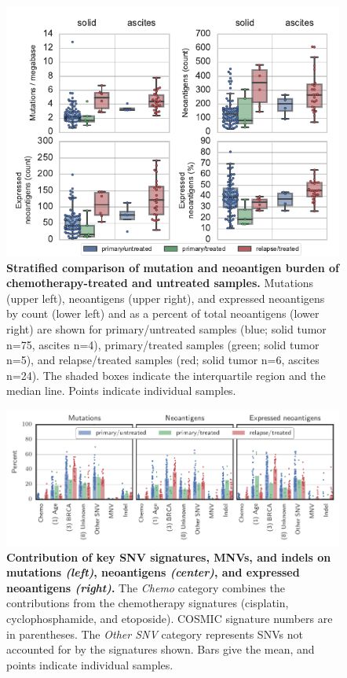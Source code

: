 \begin{figure}
\centering
\includegraphics[scale=1.0]{figures/counts.pdf}
\caption{\textbf{Stratified comparison of mutation and neoantigen burden of chemotherapy-treated and untreated samples.} Mutations (upper left), neoantigens (upper right), and expressed neoantigens by count (lower left) and as a percent of total neoantigens (lower right) are shown for primary/untreated samples (blue; solid tumor n=75, ascites n=4), primary/treated samples (green; solid tumor n=5), and relapse/treated samples (red; solid tumor n=6, ascites n=24). The shaded boxes indicate the interquartile region and the median line. Points indicate individual samples.}
\label{fig:counts}
\end{figure}

\begin{figure}[htbp]
\centering
\includegraphics[scale=1.0]{figures/sources_of_mutations_and_neoantigens.pdf}
\caption{\textbf{Contribution of key SNV signatures, MNVs, and indels on mutations \textit{(left)}, neoantigens \textit{(center)}, and expressed neoantigens \textit{(right)}.} The \textit{Chemo} category combines the contributions from the chemotherapy signatures (cisplatin, cyclophosphamide, and etoposide). COSMIC signature numbers are in parentheses. The \textit{Other SNV} category represents SNVs not accounted for by the signatures shown. Bars give the mean, and points indicate individual samples.}
\label{fig:sources}
\end{figure}

\FloatBarrier
